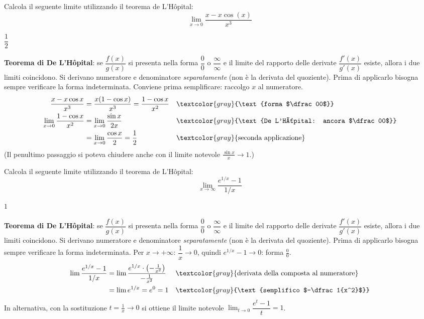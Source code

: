 \begin{question}[ID=1.5, subtitle={De L'Hôpital: $\lim_{x\to0}(x-x\cos x)/x^3$}, tags={de l'hospital, limiti}, difficulty=media]
Calcola il seguente limite utilizzando il teorema de L'Hôpital:
\[
\lim_{x \to 0} \frac{x - x \cos(x)}{x^3}
\]
\begin{solution}
$\dfrac12$
\end{solution}
\begin{explanation}
\textbf{Teorema di De L'Hôpital}: se $\dfrac{f(x)}{g(x)}$ si presenta nella forma $\dfrac00$ o $\dfrac\infty\infty$ e il limite del rapporto delle derivate $\dfrac{f'(x)}{g'(x)}$ esiste, allora i due limiti coincidono. Si derivano numeratore e denominatore \emph{separatamente} (non è la derivata del quoziente). Prima di applicarlo bisogna sempre verificare la forma indeterminata.
Conviene prima semplificare: raccolgo $x$ al numeratore.
\[\begin{aligned}
\dfrac{x-x\cos x}{x^3} &= \dfrac{x(1-\cos x)}{x^3}=\dfrac{1-\cos x}{x^2} && \textcolor{gray}{\text{forma $\dfrac00$}}\\
\lim_{x\to0}\dfrac{1-\cos x}{x^2} &= \lim_{x\to0}\dfrac{\sin x}{2x} && \textcolor{gray}{\text{De L'Hôpital: ancora $\dfrac00$}}\\
&= \lim_{x\to0}\dfrac{\cos x}{2}=\dfrac12 && \textcolor{gray}{\text{seconda applicazione}}
\end{aligned}\]
(Il penultimo passaggio si poteva chiudere anche con il limite notevole $\tfrac{\sin x}{x}\to1$.)
\end{explanation}
\end{question}


\begin{question}[ID=1.6, subtitle={De L'Hôpital: $\lim_{x\to+\infty}(e^{1/x}-1)/(1/x)$}, tags={de l'hospital, limiti}, difficulty=facile]
Calcola il seguente limite utilizzando il teorema de L'Hôpital:
\[
\lim_{x \to \infty} \frac{e^{1/x} - 1}{1/x}
\]
\begin{solution}
$1$
\end{solution}
\begin{explanation}
\textbf{Teorema di De L'Hôpital}: se $\dfrac{f(x)}{g(x)}$ si presenta nella forma $\dfrac00$ o $\dfrac\infty\infty$ e il limite del rapporto delle derivate $\dfrac{f'(x)}{g'(x)}$ esiste, allora i due limiti coincidono. Si derivano numeratore e denominatore \emph{separatamente} (non è la derivata del quoziente). Prima di applicarlo bisogna sempre verificare la forma indeterminata.
Per $x\to+\infty$: $\dfrac1x\to0$, quindi $e^{1/x}-1\to0$: forma $\tfrac00$.
\[\begin{aligned}
\lim\dfrac{e^{1/x}-1}{1/x} &= \lim\dfrac{e^{1/x}\cdot\left(-\frac1{x^2}\right)}{-\frac1{x^2}} && \textcolor{gray}{\text{derivata della composta al numeratore}}\\
&= \lim e^{1/x}=e^0=1 && \textcolor{gray}{\text{semplifico $-\dfrac1{x^2}$}}
\end{aligned}\]
In alternativa, con la sostituzione $t=\tfrac1x\to0$ si ottiene il limite notevole $\displaystyle\lim_{t\to0}\dfrac{e^t-1}{t}=1$.
\end{explanation}
\end{question}

